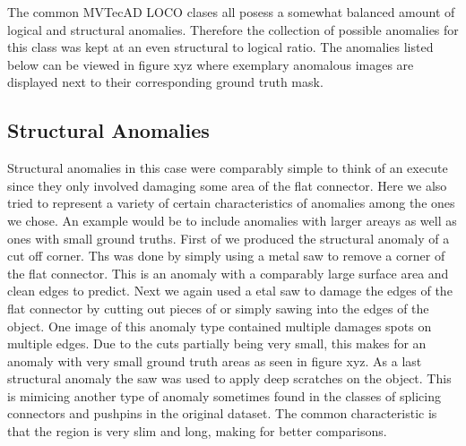 The common MVTecAD LOCO clases all posess a somewhat balanced amount of logical and structural anomalies. Therefore the collection of possible anomalies for this class was kept at an even structural 
to logical ratio. The anomalies listed below can be viewed in figure xyz where exemplary anomalous images are displayed next to their corresponding ground truth mask.

\subsection{Structural Anomalies}
Structural anomalies in this case were comparably simple to think of an execute since they only involved damaging some area of the flat connector. Here we also tried to represent a variety of 
certain characteristics of anomalies among the ones we chose. An example would be to include anomalies with larger areays as well as ones with small ground truths.\newline
First of we produced the structural anomaly of a cut off corner. Ths was done by simply using a metal saw to remove a corner of the flat connector. This is an anomaly with a comparably large 
surface area and clean edges to predict. Next we again used a etal saw to damage the edges of the flat connector by cutting out pieces of or simply sawing into the edges of the object. One image 
of this anomaly type contained multiple damages spots on multiple edges. Due to the cuts partially being very small, this makes for an anomaly with very small ground truth areas as seen in figure 
xyz. As a last structural anomaly the saw was used to apply deep scratches on the object. This is mimicing another type of anomaly sometimes found in the classes of splicing connectors and pushpins 
in the original dataset. The common characteristic is that the region is very slim and long, making for better comparisons.

